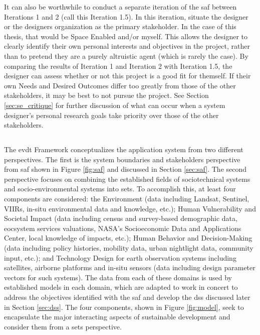It can also be worthwhile to conduct a separate iteration of the \ac{saf} between Iterations 1 and 2 (call this Iteration 1.5). In this iteration, situate the designer or the designers organization as the primary stakeholder. In the case of this thesis, that would be Space Enabled and/or myself. This allows the designer to clearly identify their own personal interests and objectives in the project, rather than to pretend they are a purely altruistic agent (which is rarely the case).
By comparing the results of Iteration 1 and Iteration 2 with Iteration 1.5, the designer can assess whether or not this project is a good fit for themself. If their own Needs and Desired Outcomes differ too greatly from those of the other stakeholders, it may be best to not pursue the project. See Section \ref{sec:se_critique} for further discussion of what can occur when a system designer's personal research goals take priority over those of the other stakeholders.





\subsection{} \label{sec:evdt-questions}

The \ac{evdt} Framework conceptualizes the application system from two different perspectives. The first is the system boundaries and stakeholders perspective from \ac{saf} shown in Figure \ref{fig:saf} and discussed in Section \ref{sec:saf}. The second perspective focuses on combining the established fields of sociotechnical systems \cite{rouseUnderstandingChangeComplex2012,siddiqiSociotechnicalSystemsSustainability2017,sussmanTeachingComplexSociotechnical2010} and socio-environmental systems \cite{elsawahEightGrandChallenges2020} into \ac{sets}. To accomplish this, at least four components are considered: the Environment (data including Landsat, Sentinel, VIIRs, in-situ environmental data and knowledge, etc.); Human Vulnerability and Societal Impact (data including census and survey-based demographic data, eocsystem services valuations, NASA's Socioeconomic Data and Applications Center, local knowledge of impacts, etc.); Human Behavior and Decision-Making (data including policy histories, mobility data, urban nightlight data, community input, etc.); and Technology Design for earth observation systems including satellites, airborne platforms and in-situ sensors (data including design parameter vectors for such systems). The data from each of these domains is used by established models in each domain, which are adapted to work in concert to address the objectives identified with the \ac{saf} and develop the \ac{dss} discussed later in Section \ref{sec:dss}. The four components, shown in Figure \ref{fig:model}, seek to encapsulate the major interacting aspects of sustainable development and consider them from a \ac{sets} perspective. 

